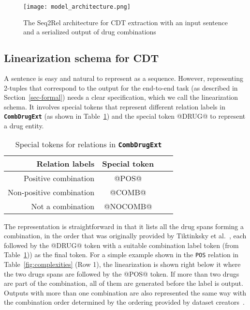 \documentclass[conference]{IEEEtran}
\begin{document}
\begin{figure*}[t!]
    \centering
    \texttt{[image: model\_architecture.png]}
    \caption{The Seq2Rel architecture for CDT extraction with an input sentence and a serialized output of drug combinations}
    \label{fig:model}
\end{figure*}


\subsection{Linearization schema for CDT} \label{linearization}
A sentence is easy and natural to represent as a sequence. However, representing 2-tuples that correspond to the output for the   end-to-end task (as described in Section~\ref{sec-formal}) needs a clear specification, which we call the linearization schema. It involves special tokens that represent different relation labels in \textbf{\texttt{CombDrugExt}} (as shown in Table~\ref{tb:stoken}) and the special token @DRUG@ to represent a drug entity.  

\begin{table}[h]
\centering
\renewcommand{\arraystretch}{1.2}
\caption{Special tokens for relations in \textbf{\texttt{CombDrugExt}}}
\begin{tabular}{r ccc}
\toprule
Relation labels & Special token \\\midrule
Positive combination  & @POS@ \\
Non-positive combination   & @COMB@\\
 Not a combination & @NOCOMB@ \\
\bottomrule
\end{tabular}


\label{tb:stoken}
\end{table}

The representation is straightforward in that it lists all the drug spans forming a combination, in the order that was originally provided by Tiktinksky et al.~\cite{tiktinsky-etal-2022-dataset}, each followed by the @DRUG@ token with a suitable combination label token (from Table~\ref{tb:stoken})) as the final token. 
For a simple example shown in the \texttt{POS} relation in Table~\ref{fig:complexities} (Row 1), the linearization is shown right below it where the two drugs spans are followed by the @POS@ token. If more than two drugs are part of the combination, all of them are generated before the label is output. Outputs with more than one combination are also represented the same way with the combination order determined by the ordering provided by dataset creators~\cite{tiktinsky-etal-2022-dataset}. 
\end{document}
